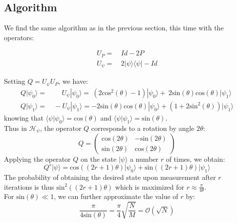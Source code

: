 \subsection{Algorithm}

We find the same algorithm as in the previous section, this time with the operators:

\begin{align*}
	U_{P} = & \ Id - 2P \\
    U_{\psi} = & \ 2 | \psi \rangle \langle \psi | - Id
\end{align*}

\noindent Setting $Q = U_{\psi} U_{P} $, we have:
\begin{align*}
	Q | \psi_0 \rangle =& \quad \ \, U_{\psi} | \psi_0 \rangle = \ (2 \mathrm{cos}^2(\theta)-1) | \psi_0 \rangle + \ 2 \mathrm{sin}(\theta)\mathrm{cos}(\theta) | \psi_1 \rangle \\
    Q | \psi_1 \rangle =&\ -U_{\psi} | \psi_1 \rangle = -2 \mathrm{sin}(\theta)\mathrm{cos}(\theta) | \psi_0 \rangle + (1 + 2 \mathrm{sin}^2(\theta)) | \psi_1 \rangle
\end{align*}
knowing that $\langle \psi | \psi_0 \rangle = \mathrm{cos}(\theta)$ and $\langle \psi | \psi_1 \rangle = \mathrm{sin}(\theta)$.
\\
Thus in $\mathcal{H}_{\psi}$, the operator $Q$ corresponds to a rotation by angle $2\theta$:
\[
Q =
\begin{pmatrix}
\mathrm{cos}(2\theta) & -\mathrm{sin}(2\theta) \\
\mathrm{sin}(2\theta) & \mathrm{cos}(2\theta)
\end{pmatrix}
\]
Applying the operator $Q$ on the state $| \psi \rangle$ a number $r$ of times, we obtain:
\[ Q^r | \psi \rangle = \mathrm{cos}((2r+1)\theta)| \psi_0 \rangle + \mathrm{sin}((2r+1)\theta)| \psi_1 \rangle\]
The probability of obtaining the desired state upon measurement after $r$ iterations is thus $\mathrm{sin}^2 \left( \left( 2r + 1 \right) \theta \right)$ which is maximized for $r \approx \frac{\pi}{4\theta}$. 
\\
For $\mathrm{sin}(\theta) \ll 1$, we can further approximate the value of $r$ by: \[\frac{\pi}{4\mathrm{sin}(\theta)} = \frac{\pi}{4} \sqrt{\frac{N}{M}} = \mathcal{O}(\sqrt{N})\]
